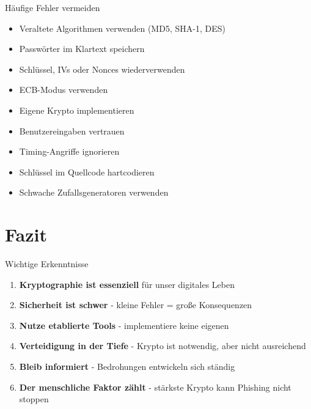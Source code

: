 \documentclass[handout]{beamer}
\begin{document}
\begin{frame}{Häufige Fehler vermeiden}
\begin{itemize}
    \item Veraltete Algorithmen verwenden (MD5, SHA-1, DES)
    \item Passwörter im Klartext speichern
    \item Schlüssel, IVs oder Nonces wiederverwenden
    \item ECB-Modus verwenden
    \item Eigene Krypto implementieren
    \item Benutzereingaben vertrauen
    \item Timing-Angriffe ignorieren
    \item Schlüssel im Quellcode hartcodieren
    \item Schwache Zufallsgeneratoren verwenden
\end{itemize}
\end{frame}

\section{Fazit}

\begin{frame}{Wichtige Erkenntnisse}
\begin{enumerate}
    \item \textbf{Kryptographie ist essenziell} für unser digitales Leben
    \item \textbf{Sicherheit ist schwer} - kleine Fehler = große Konsequenzen
    \item \textbf{Nutze etablierte Tools} - implementiere keine eigenen
    \item \textbf{Verteidigung in der Tiefe} - Krypto ist notwendig, aber nicht ausreichend
    \item \textbf{Bleib informiert} - Bedrohungen entwickeln sich ständig
    \item \textbf{Der menschliche Faktor zählt} - stärkste Krypto kann Phishing nicht stoppen
\end{enumerate}
\end{frame}
\end{document}
